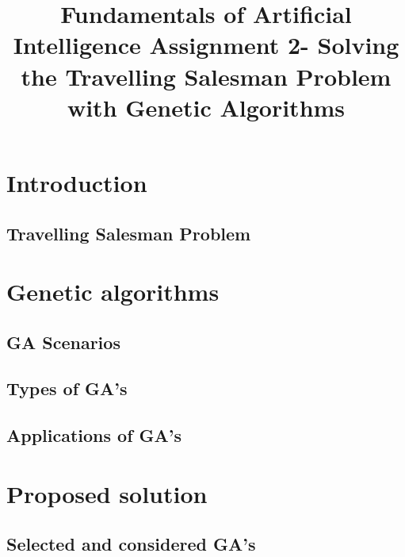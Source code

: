 \documentclass[article]{IEEEtran}
\begin{document}
\title{Fundamentals of Artificial Intelligence Assignment 2- Solving the Travelling Salesman Problem with Genetic Algorithms}

\author{
}

\maketitle

\begin{abstract}

\end{abstract}

\section{Introduction}

\subsection{Travelling Salesman Problem}

\section{Genetic algorithms}

\subsection{GA Scenarios}

\subsection{Types of GA's}

\subsection{Applications of GA's}

\section{Proposed solution}

\subsection{Selected and considered GA's}
\end{document}

